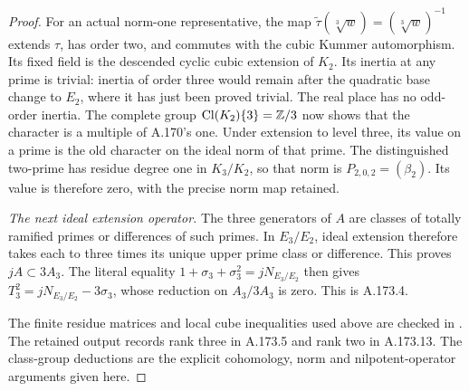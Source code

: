 \begin{proof}
For an actual norm-one representative, the map
\(\widetilde\tau(\sqrt[3]{w})=(\sqrt[3]{w})^{-1}\)
extends \(\tau\), has order two, and commutes with the cubic
Kummer automorphism.  Its fixed field is the descended
cyclic cubic extension of \(K_2\).  Its inertia at any prime
is trivial: inertia of order three would remain after the
quadratic base change to \(E_2\), where it has just been
proved trivial.  The real place has no odd-order inertia.
The complete group \(\operatorname{Cl}(K_2)\{3\}=\mathbb Z/3\)
now shows that the character is a multiple of A.170's one.
Under extension to level three, its value on a prime is the
old character on the ideal norm of that prime.  The
distinguished two-prime has residue degree one in
\(K_3/K_2\), so that norm is \(P_{2,0,2}=(\beta_2)\).
Its value is therefore zero, with the precise norm map retained.

\emph{The next ideal extension operator.}
The three generators of \(A\) are classes of totally
ramified primes or differences of such primes.  In
\(E_3/E_2\), ideal extension therefore takes each to
three times its unique upper prime class or difference.
This proves \(jA\subset3A_3\).
The literal equality
\(1+\sigma_3+\sigma_3^2=jN_{E_3/E_2}\) then gives
\(T_3^2=jN_{E_3/E_2}-3\sigma_3\), whose reduction on
\(A_3/3A_3\) is zero.  This is A.173.4.

The finite residue matrices and local cube inequalities used
above are checked in
.
The retained output records rank three in A.173.5 and rank two
in A.173.13.  The class-group deductions are the explicit
cohomology, norm and nilpotent-operator arguments given here.
\end{proof}
